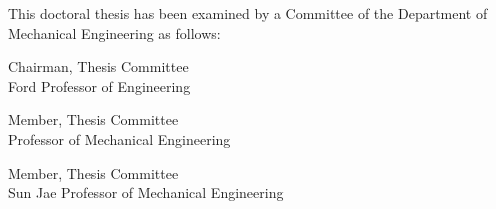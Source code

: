 %
%
%

\begin{titlepage}
\begin{large}
This doctoral thesis has been examined by a Committee of the Department
of Mechanical Engineering as follows:

\signature{Professor H. Harry Asada}{Chairman, Thesis Committee \\
   Ford Professor of Engineering}

\signature{Professor Jean-Jacques Slotine}{Member, Thesis Committee \\
   Professor of Mechanical Engineering}

\signature{Professor Neville Hogan}{Member, Thesis Committee \\
   Sun Jae Professor of Mechanical Engineering}
\end{large}
\end{titlepage}

